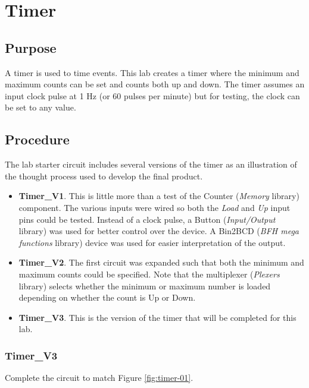 \chapter{Timer}\label{timer}

\section{Purpose}

A timer is used to time events. This lab creates a timer where the minimum and maximum counts can be set and counts both up and down. The timer assumes an input clock pulse at 1 Hz (or 60 pulses per minute) but for testing, the clock can be set to any value.

\section{Procedure}

The lab starter circuit includes several versions of the timer as an illustration of the thought process used to develop the final product.

\begin{itemize}
	\item \textbf{Timer\_V1}. This is little more than a test of the Counter (\textit{Memory} library) component. The various inputs were wired so both the \textit{Load} and \textit{Up} input pins could be tested. Instead of a clock pulse, a Button (\textit{Input/Output} library) was used for better control over the device. A Bin2BCD (\textit{BFH mega functions} library) device was used for easier interpretation of the output.
	\item \textbf{Timer\_V2}. The first circuit was expanded such that both the minimum and maximum counts could be specified. Note that the multiplexer (\textit{Plexers} library) selects whether the minimum or maximum number is loaded depending on whether the count is Up or Down.
	\item \textbf{Timer\_V3}. This is the version of the timer that will be completed for this lab.
\end{itemize}

\subsection{Timer\_V3}

Complete the circuit to match Figure \ref{fig:timer-01}.

